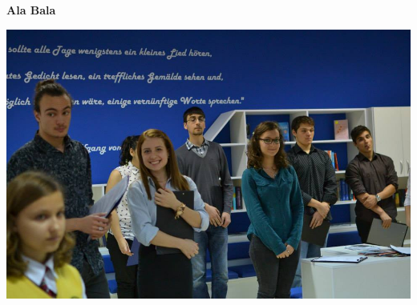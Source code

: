 \textbf{Ala Bala}

\begin{center}
\includegraphics[width=6.0in]{./Reklama/fin.jpg}\\
\end{center}
\closearticle
